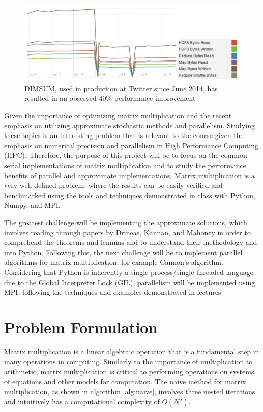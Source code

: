 \documentclass[oneside]{article}
\begin{document}
\begin{figure}[ht!]
\centering
\includegraphics[width=\textwidth]{twitter-dimsum}
\caption{DIMSUM, used in production at Twitter since June 2014, has resulted in an observed 40\% performance improvement\cite{zadeh2013dimension}}
\label{fig:transaction}
\end{figure}


Given the importance of optimizing matrix multiplication and the recent emphasis on utilizing approximate stochastic methods and parallelism. Studying these topics is an interesting problem that is relevant to the course given the emphasis on numerical precision and parallelism in High Performance Computing (HPC). Therefore, the purpose of this project will be to focus on the common serial implementations of matrix multiplication and to study the performance benefits of parallel and approximate implementations. Matrix multiplication is a very well defined problem, where the results can be easily verified and benchmarked using the tools and techniques demonstrated in class with Python, Numpy, and MPI\cite{van2011numpy}.

The greatest challenge will be implementing the approximate solutions, which involves reading through papers by Drineas, Kannan, and Mahoney in order to comprehend the theorems and lemmas and to understand their methodology and into Python. Following this, the next challenge will be to implement parallel algorithms for matrix multiplication, for example Cannon's algorithm. Considering that Python is inherently a single process/single threaded language due to the Global Interpreter Lock (GIL)\cite{beazley2010understanding}, parallelism will be implemented using MPI, following the techniques and examples demonstrated in lectures.




\section{Problem Formulation}

Matrix multiplication is a linear algebraic operation that is a fundamental step in many operations in computing. Similarly to the importance of multiplication to arithmetic, matrix multiplication is critical to performing operations on systems of equations and other models for computation. The naive method for matrix multiplication, as shown in algorithm \ref{alg:naive}, involves three nested iterations and intuitively has a computational complexity of $O(N^{3})$.
\end{document}
